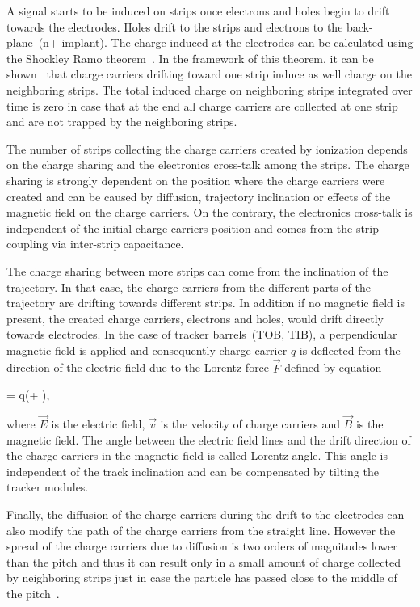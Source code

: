A signal starts to be induced on strips once electrons and holes begin to drift towards the electrodes. Holes drift to the strips and electrons to the back-plane~(n+ implant). The charge induced at the electrodes can be calculated using the Shockley Ramo theorem~\cite{doi:10.1063/1.1710367,Ramo:1939vr}. In the framework of this theorem, it can be shown~\cite{Bloch:2007zza} that charge carriers drifting toward one strip induce as well charge on the neighboring strips. The total induced charge on neighboring strips integrated over time is zero in case that at the end all charge carriers are collected at one strip and are not trapped by the neighboring strips.

The number of strips collecting the charge carriers created by ionization depends on the charge sharing and the electronics cross-talk among the strips. The charge sharing is strongly dependent on the position where the charge carriers were created and can be caused by diffusion, trajectory inclination or effects of the magnetic field on the charge carriers. On the contrary, the electronics cross-talk is independent of the initial charge carriers position and comes from the strip coupling via inter-strip capacitance.  

The charge sharing between more strips can come from the inclination of the trajectory. In that case, the charge carriers from the different parts of the trajectory are drifting towards different strips. In addition if no magnetic field is present, the created charge carriers, electrons and holes, would drift directly towards electrodes. In the case of tracker barrels~(TOB, TIB), a perpendicular magnetic field is applied  and consequently charge carrier $q$ is deflected from the direction of the electric field due to the Lorentz force $\vec{F}$ defined by equation

{
   =  q(+ \times {}),
}

where $\vec{E}$ is the electric field, $\vec{v}$ is the velocity of charge carriers and $\vec{B}$ is the magnetic field. The angle between the electric field lines and the drift direction of the charge carriers in the magnetic field is called Lorentz angle. This angle is independent of the track inclination and can be compensated by tilting the tracker modules.

Finally, the diffusion of the charge carriers during the drift to the electrodes can also modify the path of the charge carriers from the straight line. However the spread of the charge carriers due to diffusion is two orders of magnitudes lower than the pitch and thus it can result only in a small amount of charge collected by neighboring strips just in case the particle has passed close to the middle of the pitch~\cite{Bloch:2007zza}.


